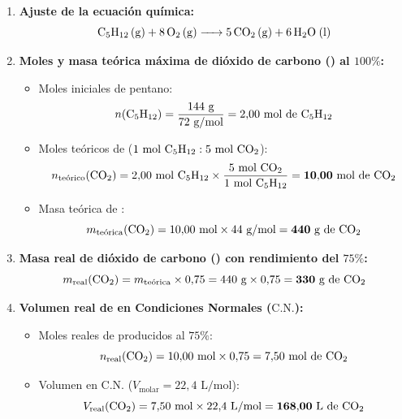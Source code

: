\documentclass[11pt,a4paper]{article}
\begin{document}
\vspace{0.2cm}
\begin{enumerate}[label=\textbf{\alph*)}, leftmargin=2em, itemsep=8pt]
    \item \textbf{Ajuste de la ecuación química:}
    \[
    \ce{C5H12 (g) + 8 O2 (g) -> 5 CO2 (g) + 6 H2O (l)}
    \]

    \item \textbf{Moles y masa teórica máxima de dióxido de carbono () al $100\%$:}
    \begin{itemize}[leftmargin=1.5em, itemsep=2pt]
        \item Moles iniciales de pentano:
        \[
        n(\ce{C5H12}) = \frac{144\text{ g}}{72\text{ g/mol}} = 2{,}00\text{ mol de \ce{C5H12}}
        \]
        \item Moles teóricos de  ($1\text{ mol \ce{C5H12}} : 5\text{ mol \ce{CO2}}$):
        \[
        n_{\text{teórico}}(\ce{CO2}) = 2{,}00\text{ mol \ce{C5H12}} \times \frac{5\text{ mol \ce{CO2}}}{1\text{ mol \ce{C5H12}}} = \mathbf{10{,}00\text{ mol de \ce{CO2}}}
        \]
        \item Masa teórica de :
        \[
        m_{\text{teórica}}(\ce{CO2}) = 10{,}00\text{ mol} \times 44\text{ g/mol} = \mathbf{440\text{ g de \ce{CO2}}}
        \]
    \end{itemize}

    \item \textbf{Masa real de dióxido de carbono () con rendimiento del $75\%$:}
    \[
    m_{\text{real}}(\ce{CO2}) = m_{\text{teórica}} \times 0{,}75 = 440\text{ g} \times 0{,}75 = \mathbf{330\text{ g de \ce{CO2}}}
    \]

    \item \textbf{Volumen real de  en Condiciones Normales ($\text{C.N.}$):}
    \begin{itemize}[leftmargin=1.5em, itemsep=2pt]
        \item Moles reales de  producidos al $75\%$:
        \[
        n_{\text{real}}(\ce{CO2}) = 10{,}00\text{ mol} \times 0{,}75 = 7{,}50\text{ mol de \ce{CO2}}
        \]
        \item Volumen en C.N. ($V_{\text{molar}} = 22{,}4\text{ L/mol}$):
        \[
        V_{\text{real}}(\ce{CO2}) = 7{,}50\text{ mol} \times 22{,}4\text{ L/mol} = \mathbf{168{,}00\text{ L de \ce{CO2}}}
        \]
    \end{itemize}
\end{enumerate}
\end{document}
